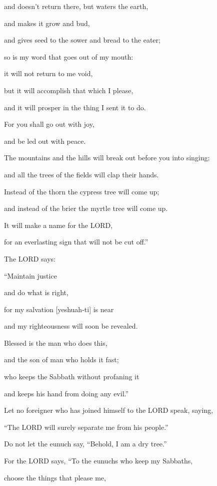 and doesn’t return there, but waters the earth,

and makes it grow and bud,

and gives seed to the sower and bread to the eater;

\myverse{}so is my word that goes out of my mouth:

it will not return to me void,

but it will accomplish that which I please,

and it will prosper in the thing I sent it to do.

\myverse{}For you shall go out with joy,

and be led out with peace.

The mountains and the hills will break out before you into singing;

and all the trees of the fields will clap their hands.

\myverse{}Instead of the thorn the cypress tree will come up;

and instead of the brier the myrtle tree will come up.

It will make a name for the LORD,

for an everlasting sign that will not be cut off.”


\mychapter{} \myverse*{}The LORD says:

\quad\quad “Maintain justice

and do what is right,

for my salvation [yeshuah-ti] is near

and my righteousness will soon be revealed.

\myverse{}Blessed is the man who does this,

and the son of man who holds it fast;

who keeps the Sabbath without profaning it

and keeps his hand from doing any evil.”


\vspace{\baselineskip} \myverse{}Let no foreigner who has joined himself to the LORD speak, saying,

“The LORD will surely separate me from his people.”

Do not let the eunuch say, “Behold, I am a dry tree.”


\vspace{\baselineskip} \myverse{}For the LORD says, “To the eunuchs who keep my Sabbaths,

choose the things that please me,


